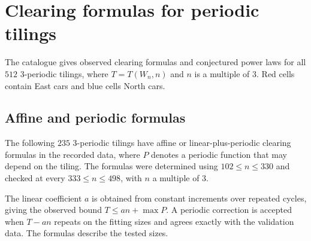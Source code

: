 \section{Clearing formulas for periodic tilings}\label{app:survey}
The catalogue gives observed clearing formulas and conjectured power laws
for all $512$ $3$-periodic tilings, where $T=T(W_n,n)$ and $n$ is a multiple of $3$.
Red cells contain East cars and blue cells North cars.

\subsection{Affine and periodic formulas}
The following $235$ $3$-periodic tilings have affine or linear-plus-periodic
clearing formulas in the recorded data, where $P$ denotes
a periodic function that may depend on the tiling.
The formulas were determined using
$102\leq n\leq330$ and checked at every
$333\leq n\leq498$, with $n$ a multiple of $3$.

The linear coefficient $a$ is obtained from constant increments over repeated cycles,
giving the observed bound $T\leq an+\max P$.
A periodic correction is accepted when $T-an$ repeats on the fitting sizes
and agrees exactly with the validation data.
The formulas describe the tested sizes.

